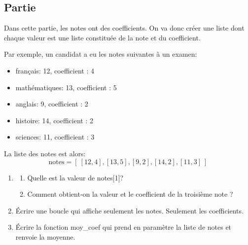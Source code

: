\documentclass[12pt,a4paper]{article}
\newcounter{numexo}
\begin{document}
\newpage
\addtocounter{numexo}{1}
\subsection*{\Large Partie \thenumexo }
Dans cette partie, les notes ont des coefficients. On va donc créer une liste dont chaque valeur est une liste constituée de la note et du coefficient. 

Par exemple, un candidat a eu les notes suivantes à un examen:
\begin{itemize}
\item français: 12, coefficient : 4
\item mathématiques: 13, coefficient : 5
\item anglais: 9, coefficient : 2
\item histoire: 14, coefficient : 2
\item sciences: 11, coefficient : 3
\end{itemize}
La liste des notes est alors:
$$\text{notes}=[~[12,4],[13,5],[9,2],[14,2],[11,3]~]$$
\begin{enumerate}
\item \begin{enumerate}
\item Quelle est la valeur de \textsf{notes[1]}? \vspace{2cm}

\item Comment obtient-on la valeur et le coefficient de la troisième note ?\vspace{2cm}

\end{enumerate}

\item Écrire une boucle qui affiche seulement les notes. Seulement les coefficients. \vspace{4cm}

\item Écrire la fonction \textsf{moy\_coef} qui prend en paramètre la liste de notes et renvoie la moyenne.


\end{enumerate}
\end{document}
